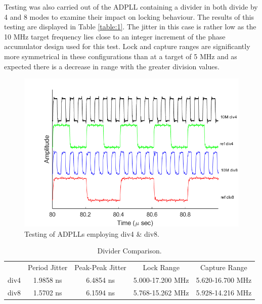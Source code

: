 \documentclass[11pt,english,british]{report}
\begin{document}
Testing was also carried out of the ADPLL containing a divider in both divide by 4 and 8 modes to examine their impact on locking behaviour. The results of this testing are displayed in Table \ref{table:1}. The jitter in this case is rather low as the 10 MHz target frequency lies close to an integer increment of the phase accumulator design used for this test. Lock and capture ranges are significantly more symmetrical in these configurations than at a target of 5 MHz and as expected there is a decrease in range with the greater division values.
\begin{figure}[h]
	\centering
	\includegraphics[scale=0.5]{../matlab/painintheass}
	\caption{Testing of ADPLLs employing div4 \& div8.}
	\label{fig:div}
\end{figure}
\begin{table}[!ht]
	\begin{center} 
		\begin{tabular}{c|c|c|c|c}           
			& Period Jitter & Peak-Peak Jitter & Lock Range & Capture Range \\
			div4 & 1.9858 ns & 6.4854 ns & 5.000-17.200 MHz & 5.620-16.700 MHz \\
			div8 & 1.5702 ns & 6.1594 ns & 5.768-15.262 MHz & 5.928-14.216 MHz \\
		\end{tabular}
		\caption{Divider Comparison.}
		\label{table:b_c_perf}
	\end{center}
\end{table}
\end{document}
